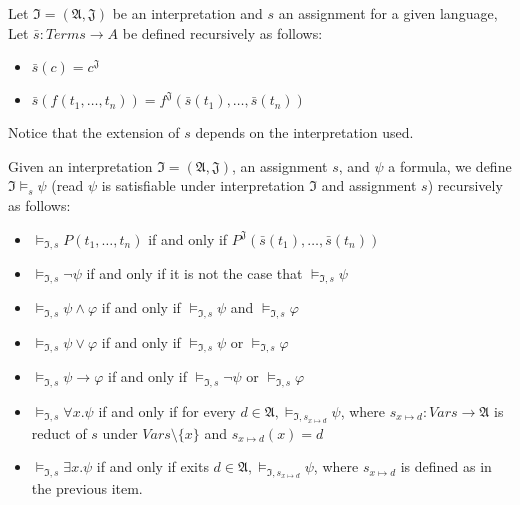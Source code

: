 \begin{definition}
  Let $\mathfrak{I} = (\mathfrak{A}, \mathfrak{J})$ be an interpretation and $s$ an assignment for a given language,
  Let $\bar{s} : Terms \rightarrow A$ be defined recursively as follows:
  \begin{itemize}
    \item $\bar{s}(c) = c^\mathfrak{J}$
    \item $\bar{s}(f(t_1, \dots, t_n)) = f^\mathfrak{J}(\bar{s}(t_1), \dots, \bar{s}(t_n))$
  \end{itemize}
\end{definition}

Notice that the extension of $s$ depends on the interpretation used.

\begin{definition}
  Given an interpretation $\mathfrak{I} = (\mathfrak{A}, \mathfrak{J})$, an assignment $s$, and $\psi$ a formula, we define $\mathfrak{I} \models_s \psi$ (read $\psi$ is satisfiable under interpretation $\mathfrak{I}$ and assignment $s$) recursively as follows:
  \begin{itemize}
    \item $\models_{\mathfrak{I}, s} P(t_1, \dots, t_n)$ if and only if $P^{\mathfrak{J}}(\bar{s}(t_1), \dots, \bar{s}(t_n))$
    \item $\models_{\mathfrak{I}, s} \neg \psi$ if and only if  it is not the case that $\models_{\mathfrak{I}, s}   \psi$
    \item $\models_{\mathfrak{I}, s} \psi \land \varphi$ if and only if $\models_{\mathfrak{I}, s}  \psi$ and $   \models_{\mathfrak{I}, s}  \varphi$
    \item $   \models_{\mathfrak{I}, s}  \psi \lor \varphi$ if and only if $   \models_{\mathfrak{I}, s}  \psi$ or $   \models_{\mathfrak{I}, s}  \varphi$
    \item $   \models_{\mathfrak{I}, s}  \psi \rightarrow \varphi$ if and only if $   \models_{\mathfrak{I}, s}  \neg \psi$ or $   \models_{\mathfrak{I}, s}  \varphi$
    \item $   \models_{\mathfrak{I}, s}  \forall x . \psi$ if and only if for every $d \in \mathfrak{A},    \models_{\mathfrak{I}, s_{x \mapsto d}} \psi$, where $s_{x \mapsto d} : Vars \rightarrow \mathfrak{A}$ is reduct of $s$ under $Vars \setminus \{x\}$ and $s_{x \mapsto d}(x) = d$
    \item $   \models_{\mathfrak{I}, s}  \exists x . \psi$ if and only if exits $d \in \mathfrak{A},    \models_{\mathfrak{I}, s_{x \mapsto d}} \psi$, where $s_{x \mapsto d}$ is defined as in the previous item.
  \end{itemize}


\end{definition}
